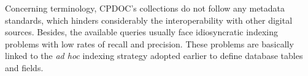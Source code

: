 Concerning terminology, CPDOC's collections do not follow any metadata
standards, which hinders considerably the interoperability with other
digital sources. Besides, the available queries usually face idiosyncratic indexing
problems with low rates of recall and precision. These problems are
basically linked to the \emph{ad hoc} indexing strategy adopted
earlier to define database tables and fields.


%

